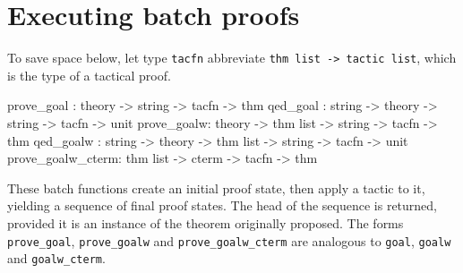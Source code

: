 \section{Executing batch proofs}\label{sec:executing-batch}
%
To save space below, let type \texttt{tacfn} abbreviate \texttt{thm list ->
  tactic list}, which is the type of a tactical proof.
\begin{ttbox}
prove_goal :           theory ->             string -> tacfn -> thm
qed_goal   : string -> theory ->             string -> tacfn -> unit
prove_goalw:           theory -> thm list -> string -> tacfn -> thm
qed_goalw  : string -> theory -> thm list -> string -> tacfn -> unit
prove_goalw_cterm:               thm list -> cterm  -> tacfn -> thm
\end{ttbox}
These batch functions create an initial proof state, then apply a tactic to
it, yielding a sequence of final proof states.  The head of the sequence is
returned, provided it is an instance of the theorem originally proposed.
The forms \texttt{prove_goal}, \texttt{prove_goalw} and
\texttt{prove_goalw_cterm} are analogous to \texttt{goal}, \texttt{goalw} and
\texttt{goalw_cterm}.  

